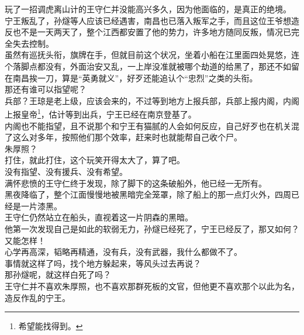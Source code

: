 \begin{multicols}{\theparacolNo}
玩了一招调虎离山计的王守仁并没能高兴多久，因为他面临的，是真正的绝境。\\

宁王叛乱了，孙燧等人应该已经遇害，南昌也已落入叛军之手，而且这位王爷想造反也不是一天两天了，整个江西都安置了他的势力，许多地方随同反叛，情况已完全失去控制。\\

虽然有巡抚头衔，旗牌在手，但就目前这个状况，坐着小船在江里面四处晃悠，连个落脚点都没有，外面治安又乱，一上岸没准就被哪个劫道的给黑了，那还不如留在南昌挨一刀，算是“英勇就义”，好歹还能追认个“忠烈”之类的头衔。\\

那还有谁可以指望呢？\\

兵部？王琼是老上级，应该会来的，不过等到地方上报兵部，兵部上报内阁，内阁上报皇帝\footnote{希望能找得到。}，估计等到出兵，宁王已经在南京登基了。\\

内阁也不能指望，且不说那个和宁王有猫腻的人会如何反应，自己好歹也在机关混了这么对多年，按照他们那个效率，赶来时也就能帮自己收个尸。\\

朱厚照？\\

打住，就此打住，这个玩笑开得太大了，算了吧。\\

没有指望、没有援兵、没有希望。\\

满怀悲愤的王守仁终于发现，除了脚下的这条破船外，他已经一无所有。\\

黑夜降临了，整个江面慢慢地被黑暗完全笼罩，除了船上的那一点灯火外，四周已经是一片漆黑。\\

王守仁仍然站立在船头，直视着这一片阴森的黑暗。\\

他第一次发现自己是如此的软弱无力，孙燧已经死了，宁王已经反了，那又如何？又能怎样！\\

心学再高深，韬略再精通，没有兵，没有武器，我什么都做不了。\\

事情就这样了吗，找个地方躲起来，等风头过去再说？\\

那孙燧呢，就这样白死了吗？\\

王守仁并不喜欢朱厚照，也不喜欢那群死板的文官，但他更不喜欢那个以此为名，造反作乱的宁王。\\


\end{multicols}
